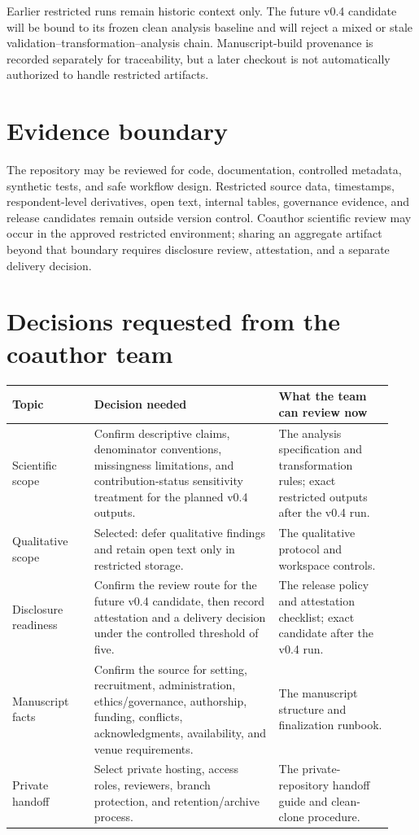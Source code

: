 \documentclass[11pt]{article}
\begin{document}
Earlier restricted runs remain historic context only. The future v0.4 candidate
will be bound to its frozen clean analysis baseline and will reject a mixed or
stale validation--transformation--analysis chain. Manuscript-build provenance
is recorded separately for traceability, but a later checkout is not
automatically authorized to handle restricted artifacts.

\section*{Evidence boundary}

The repository may be reviewed for code, documentation, controlled metadata,
synthetic tests, and safe workflow design. Restricted source data, timestamps,
respondent-level derivatives, open text, internal tables, governance evidence,
and release candidates remain outside version control. Coauthor scientific
review may occur in the approved restricted environment; sharing an aggregate
artifact beyond that boundary requires disclosure review, attestation, and a
separate delivery decision.

\section*{Decisions requested from the coauthor team}

{\small
\renewcommand{\arraystretch}{1.08}
\setlength{\tabcolsep}{4pt}
\begin{tabular}{@{}L{0.20\linewidth}L{0.45\linewidth}L{0.28\linewidth}@{}}
\toprule
Topic & Decision needed & What the team can review now \\
\midrule
Scientific scope & Confirm descriptive claims, denominator conventions,
missingness limitations, and contribution-status sensitivity treatment for the
planned v0.4 outputs. & The analysis specification and transformation rules;
exact restricted outputs after the v0.4 run. \\
Qualitative scope & Selected: defer qualitative findings and retain open text
only in restricted storage. & The qualitative protocol and workspace controls. \\
Disclosure readiness & Confirm the review route for the future v0.4 candidate,
then record attestation and a delivery decision under the controlled threshold
of five. & The release policy and attestation checklist; exact candidate after
the v0.4 run. \\
Manuscript facts & Confirm the source for setting, recruitment, administration,
ethics/governance, authorship, funding, conflicts, acknowledgments, availability,
and venue requirements. & The manuscript structure and finalization runbook. \\
Private handoff & Select private hosting, access roles, reviewers, branch
protection, and retention/archive process. & The private-repository handoff
guide and clean-clone procedure. \\
\bottomrule
\end{tabular}
}
\end{document}
